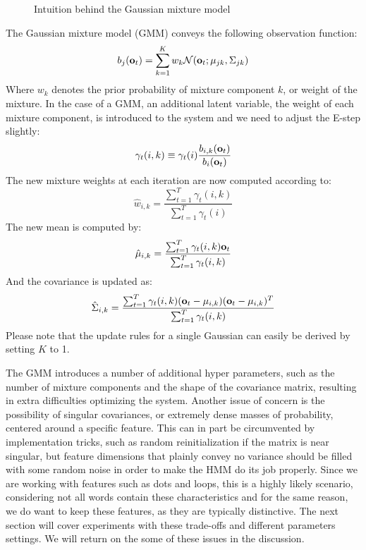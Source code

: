 \documentclass[conference]{IEEEtran}
\begin{document}
\begin{figure}[ht]
{    \label{fig:subfig2}
  }
  \label{fig:subfigureExample}
  \caption[Optional caption for list of figures]{Intuition behind the Gaussian mixture model}
\end{figure}
The Gaussian mixture model (GMM) conveys the following observation function:
\begin{equation}
\label{MOGprobability}
 b_{j}({\bf o}_{t}) = \displaystyle \sum_{k = 1}^K w_{k} \mathcal{N}({\bf o}_{t}; \mu_{jk}, \Sigma_{jk})
\end{equation}
Where $w_{k}$ denotes the prior probability of mixture component $k$, or weight of the mixture. In the case of a GMM, an additional latent variable, the weight of each mixture component, is introduced to the system and we need to adjust the E-step slightly:
\begin{equation}
 \gamma_{t}(i,k) \equiv \gamma_{t}(i) \frac{ b_{i,k}({\bf o}_{t}) } { b_{i}({\bf o}_{t}) }
\end{equation}
The new mixture weights at each iteration are now computed according to:
\begin{equation}
 \label{updateWeightGMM}
 \hat{w}_{i,k} = \displaystyle \frac{\sum_{t=1}^{T} \gamma_{t}(i,k) }{ \sum_{t=1}^{T} \gamma_{t}(i) }
\end{equation}
The new mean is computed by:
\begin{equation}
 \label{updateMeanGMM}
 \hat{\bf{\mu}}_{i,k} = \displaystyle \frac{ \sum_{t=1}^{T} \gamma_{t}(i,k) {\bf o}_{t} }{ \sum_{t=1}^{T} \gamma_{t}(i,k) }
\end{equation}
And the covariance is updated as:
\begin{equation}
 \label{updateCovarianceGMM}
 \hat{\Sigma}_{i,k} = \displaystyle \frac{ \sum_{t=1}^{T} \gamma_{t}(i,k) ({\bf o}_{t} - {\bf \mu}_{i,k})( {\bf o}_{t} - {\bf \mu}_{i,k} )^{T} }{ \sum_{t=1}^{T} \gamma_{t}(i,k) }
\end{equation}
Please note that the update rules for a single Gaussian can easily be derived by setting $K$ to 1. 

The GMM introduces a number of additional hyper parameters, such as the number of mixture components and the shape of the covariance matrix, resulting in extra difficulties optimizing the system. Another issue of concern is the possibility of singular covariances, or extremely dense masses of probability, centered around a specific feature. This can in part be circumvented by implementation tricks, such as random reinitialization if the matrix is near singular, but feature dimensions that plainly convey no variance should be filled with some random noise in order to make the HMM do its job properly. Since we are working with features such as dots and loops, this is a highly likely scenario, considering not all words contain these characteristics and for the same reason, we do want to keep these features, as they are typically distinctive. The next section will cover experiments with these trade-offs and different parameters settings. We will return on the some of these issues in the discussion.
\end{document}
